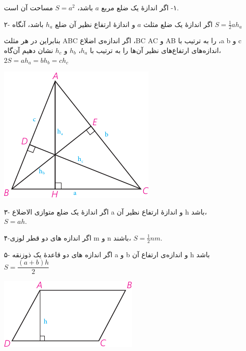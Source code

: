 \documentclass[12pt, a4paper, twoside]{book}
\begin{document}
\begin{minipage}{0.65\textwidth}
	١- اگر اندازهٔ یک ضلع مربع $a$ باشد، $S=a^2$ مساحت آن است.
	
	۲- اگر اندازهٔ یک ضلع مثلث $a$ و اندازهٔ ارتفاع نظیر آن ضلع $h_a$ باشد، آنگاه $S = \frac12 ah_a$
	
	بنابراین در هر مثلث ABC اگر اندازه‌ی اضلاع ،BC AC و AB را به ترتیب با ،a b و c اندازه‌های ارتفاع‌های نظیر آن‌ها را به ترتیب با $h_a$، $h_b$ و $h_c$ نشان دهیم آن‌گاه، $2S = ah_a = bh_b = ch_c$
	\end{minipage}
\begin{minipage}{0.3\textwidth}
\begin{flushleft}
		\includegraphics{"Shapes/Fasl - 3/Dars 2/P65-S1"}
\end{flushleft}
\end{minipage}

\begin{minipage}{0.65\textwidth}
۳- اگر اندازهٔ یک ضلع متوازی الاضلاع a و اندازهٔ ارتفاع نظیر آن h باشد، \\ $S=ah$.

۴-اگر اندازه های دو قطر لوزی m و n باشند، $S=\frac12 nm$.
	
۵- اگر اندازه های دو قاعدهٔ یک ذوزنقه a و b و اندازه‌ی ارتفاع آن h باشد\\
	 $S = \dfrac{(a+b)h}2$
\end{minipage}
\begin{minipage}{0.3\textwidth}
	\begin{flushleft}
		\includegraphics{"Shapes/Fasl - 3/Dars 2/P65-S2"}
	\end{flushleft}
\end{minipage}
\end{document}
